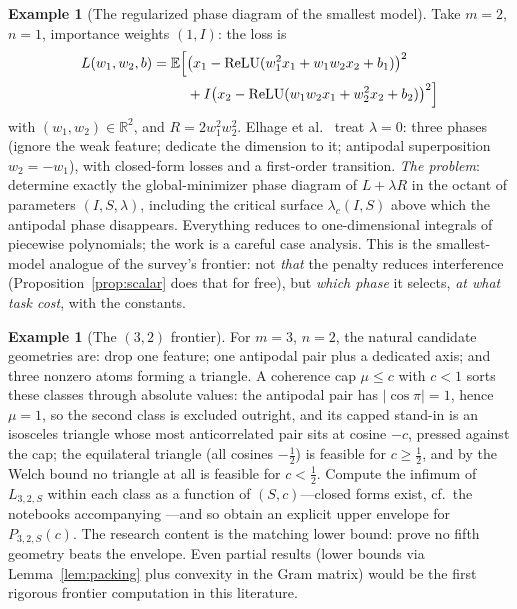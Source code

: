 \documentclass[11pt]{amsart}
\theoremstyle{plain}
\theoremstyle{definition}
\newtheorem{example}[theorem]{Example}
\DeclareMathOperator{\relu}{ReLU}
\newcommand{\E}{\mathbb{E}}
\newcommand{\R}{\mathbb{R}}
\begin{document}
\begin{example}[The regularized phase diagram of the smallest model]\label{ex:21}
Take $m=2$, $n=1$, importance weights $(1,I)$: the loss is
\begin{align*}
L(w_1,w_2,b) = \E\Bigl[&\bigl(x_1-\relu(w_1^2x_1+w_1w_2x_2+b_1)\bigr)^2\\
&+ I\bigl(x_2-\relu(w_1w_2x_1+w_2^2x_2+b_2)\bigr)^2\Bigr]
\end{align*}
with $(w_1,w_2)\in\R^2$, and $R = 2w_1^2w_2^2$. Elhage et al.~\cite{elhage2022} treat $\lambda=0$: three phases (ignore the weak feature; dedicate the dimension to it; antipodal superposition $w_2=-w_1$), with closed-form losses and a first-order transition. \emph{The problem}: determine exactly the global-minimizer phase diagram of $L+\lambda R$ in the octant of parameters $(I,S,\lambda)$, including the critical surface $\lambda_c(I,S)$ above which the antipodal phase disappears. Everything reduces to one-dimensional integrals of piecewise polynomials; the work is a careful case analysis. This is the smallest-model analogue of the survey's frontier: not \emph{that} the penalty reduces interference (Proposition~\ref{prop:scalar} does that for free), but \emph{which phase} it selects, \emph{at what task cost}, with the constants.
\end{example}

\begin{example}[The $(3,2)$ frontier]
For $m=3$, $n=2$, the natural candidate geometries are: drop one feature; one antipodal pair plus a dedicated axis; and three nonzero atoms forming a triangle. A coherence cap $\mu\le c$ with $c<1$ sorts these classes through absolute values: the antipodal pair has $|\cos\pi|=1$, hence $\mu=1$, so the second class is excluded outright, and its capped stand-in is an isosceles triangle whose most anticorrelated pair sits at cosine $-c$, pressed against the cap; the equilateral triangle (all cosines $-\tfrac12$) is feasible for $c\ge\tfrac12$, and by the Welch bound no triangle at all is feasible for $c<\tfrac12$. Compute the infimum of $L_{3,2,S}$ within each class as a function of $(S,c)$---closed forms exist, cf.\ the notebooks accompanying \cite{elhage2022}---and so obtain an explicit upper envelope for $P_{3,2,S}(c)$. The research content is the matching lower bound: prove no fifth geometry beats the envelope. Even partial results (lower bounds via Lemma~\ref{lem:packing} plus convexity in the Gram matrix) would be the first rigorous frontier computation in this literature.
\end{example}
\end{document}
